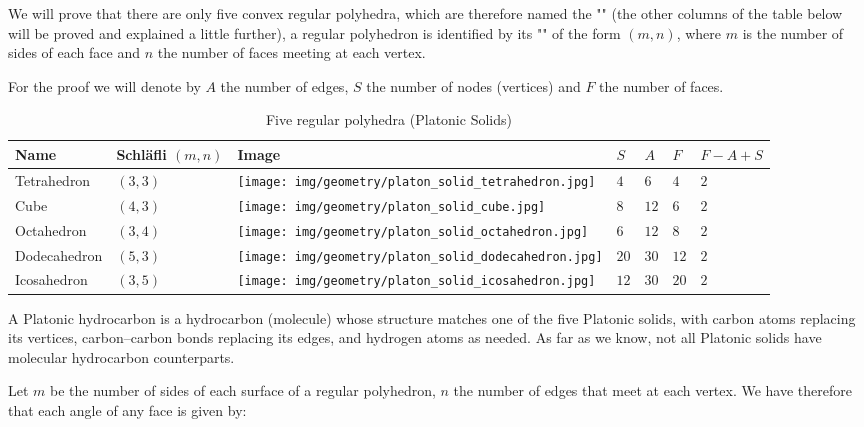 {	\begin{theorem}
	We will prove that there are only five convex regular polyhedra, which are therefore named the "" (the other columns of the table below will be proved and explained a little further), a regular polyhedron is identified by its "" of the form $(m,n)$, where $m$ is the number of sides of each face and $n$ the number of faces meeting at each vertex.
	
	For the proof  we will denote by $A$ the number of edges, $S$ the number of nodes (vertices) and $F$ the number of faces.
	\end{theorem}
	\begin{table}[H]
	\begin{center}
		\begin{tabular}{|>{\centering\arraybackslash}m{2.2cm} |>{\centering\arraybackslash}m{2.3cm} |>{\centering\arraybackslash}m{3.5cm} |>{\centering\arraybackslash}m{0.8cm} |>{\centering\arraybackslash}m{0.8cm} |>{\centering\arraybackslash}m{0.8cm} |>{\centering\arraybackslash}m{2.5cm} |}
			  \hline
			  \rowcolor[gray]{0.75}Name & Schläfli $(m,n)$ & Image & $S$ & $A$ & $F$ & $F-A+S$ \\ \hline
			  Tetrahedron & $(3, 3)$ & \texttt{[image: img/geometry/platon\_solid\_tetrahedron.jpg]} & $4$ & $6$ & $4$ & $2$\\ \hline
			  Cube & $(4, 3)$  & \texttt{[image: img/geometry/platon\_solid\_cube.jpg]} & $8$ & $12$ & $6$ & $2$ \\ \hline
			  Octahedron & $(3, 4)$ & \texttt{[image: img/geometry/platon\_solid\_octahedron.jpg]} & $6$ & $12$ & $8$ & $2$  \\ \hline
			  Dodecahedron & $(5, 3)$ & \texttt{[image: img/geometry/platon\_solid\_dodecahedron.jpg]} & $20$ & $30$ & $12$ & $2$  \\ \hline
			  Icosahedron & $(3, 5)$ & \texttt{[image: img/geometry/platon\_solid\_icosahedron.jpg]} & $12$ & $30$ & $20$ & $2$ \\\hline
		\end{tabular}
		\end{center}
		\caption{Five regular polyhedra (Platonic Solids)}
	\end{table}
	\begin{tcolorbox}[title=Remark,colframe=black,arc=10pt]
	A Platonic hydrocarbon is a hydrocarbon (molecule) whose structure matches one of the five Platonic solids, with carbon atoms replacing its vertices, carbon–carbon bonds replacing its edges, and hydrogen atoms as needed. As far as we know, not all Platonic solids have molecular hydrocarbon counterparts.
	\end{tcolorbox}
	\begin{dem}
	Let $m$ be the number of sides of each surface of a regular polyhedron, $n$ the number of edges that meet at each vertex. We have therefore that each angle of any face is given by:
	

\end{dem}}
